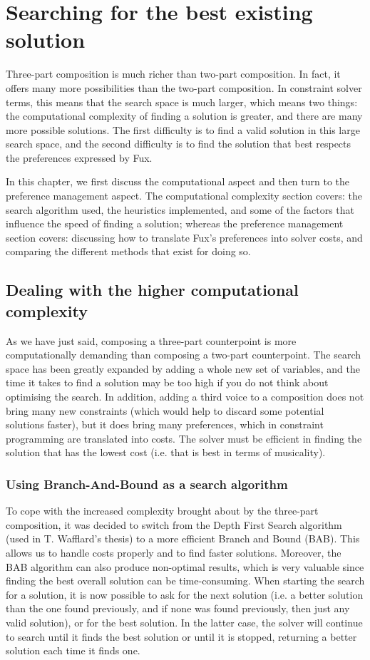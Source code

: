 \chapter{Searching for the best existing solution}\label{chapter:search}
Three-part composition is much richer than two-part composition. In fact, it offers many more possibilities than the two-part composition. In constraint solver terms, this means that the search space is much larger, which means two things: the computational complexity of finding a solution is greater, and there are many more possible solutions. The first difficulty is to find a valid solution in this large search space, and the second difficulty is to find the solution that best respects the preferences expressed by Fux.

In this chapter, we first discuss the computational aspect and then turn to the preference management aspect.
The computational complexity section covers: the search algorithm used, the heuristics implemented, and some of the factors that influence the speed of finding a solution; whereas the preference management section covers: discussing how to translate Fux's preferences into solver costs, and comparing the different methods that exist for doing so. 

\section{Dealing with the higher computational complexity}
As we have just said, composing a three-part counterpoint is more computationally demanding than composing a two-part counterpoint. The search space has been greatly expanded by adding a whole new set of variables, and the time it takes to find a solution may be too high if you do not think about optimising the search. In addition, adding a third voice to a composition does not bring many new constraints (which would help to discard some potential solutions faster), but it does bring many preferences, which in constraint programming are translated into costs. The solver must be efficient in finding the solution that has the lowest cost (i.e. that is best in terms of musicality).

\subsection{Using Branch-And-Bound as a search algorithm}

To cope with the increased complexity brought about by the three-part composition, it was decided to switch from the Depth First Search algorithm (used in T. Wafflard's thesis) to a more efficient Branch and Bound (BAB). This allows us to handle costs properly and to find faster solutions. Moreover, the BAB algorithm can also produce non-optimal results, which is very valuable since finding the best overall solution can be time-consuming. When starting the search for a solution, it is now possible to ask for the next solution (i.e. a better solution than the one found previously, and if none was found previously, then just any valid solution), or for the best solution. In the latter case, the solver will continue to search until it finds the best solution or until it is stopped, returning a better solution each time it finds one.


